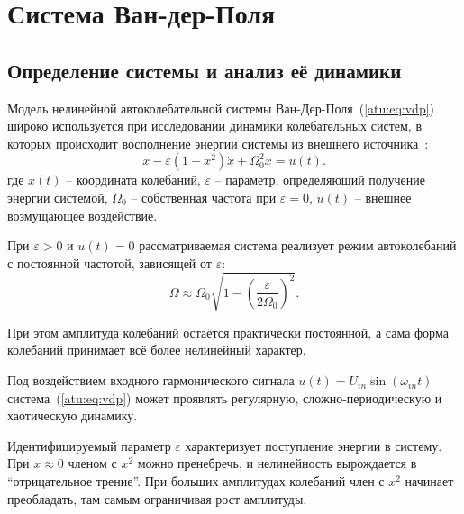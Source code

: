 
\FloatBarrier

\section{Система Ван-дер-Поля} %
\label{atu:sect:vdp}


\subsection{Определение системы и анализ её динамики} %


Модель нелинейной автоколебательной системы Ван-Дер-Поля~(\ref{atu:eq:vdp})
широко используется при исследовании динамики
колебательных систем, в которых происходит восполнение
энергии системы из внешнего источника~\cite{anisch_nonlin_eff,magni_theory_dyn_chaos,atu_asau16}:
%
\begin{equation}
 \ddot{x} - \varepsilon (1-x^2)  \dot{x} + \Omega_0^2 x  = u(t) .
\label{atu:eq:vdp}
\end{equation}
\noindent
где
\(x(t)\) -- координата колебаний,
\( \varepsilon \) -- параметр, определяющий получение
  энергии системой,
\( \Omega_0 \) -- собственная частота при \( \varepsilon = 0 \),
\(u(t)\) -- внешнее возмущающее воздействие.

При \( \varepsilon > 0 \) и \( u(t) = 0 \)
рассматриваемая система реализует режим автоколебаний
с постоянной частотой, зависящей от \( \varepsilon \):
%
\begin{equation}
\Omega \approx \Omega_0 \sqrt{ 1 - \left( \frac{\varepsilon}{2 \Omega_0} \right)^2 }.
\label{atu:eq:vdp_Omega}
\end{equation}

При этом амплитуда колебаний остаётся практически постоянной,
а сама форма колебаний принимает всё более нелинейный характер.

Под воздействием входного гармонического сигнала
\( u(t) = U_{in} \sin ( \omega_{in} t ) \)
система~(\ref{atu:eq:vdp}) может проявлять регулярную, сложно-периодическую
и хаотическую динамику.

Идентифицируемый параметр \( \varepsilon \)
характеризует поступление энергии в систему.
При $x \approx 0$ членом с $x^2$ можно пренебречь,
и нелинейность вырождается в ``отрицательное трение''.
При больших амплитудах колебаний член с $x^2$
начинает преобладать, там самым ограничивая рост амплитуды.


